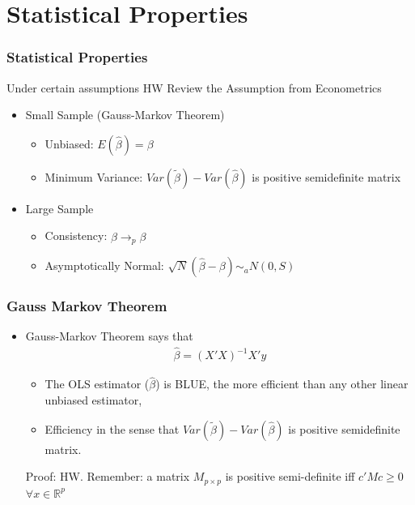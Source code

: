 \documentclass[
  shownotes,
  xcolor={svgnames},
  hyperref={colorlinks,citecolor=DarkBlue,linkcolor=DarkRed,urlcolor=DarkBlue}
  , aspectratio=169]{beamer}
\begin{document}
\section{Statistical Properties}
\begin{frame}
\frametitle{Statistical Properties}

Under certain assumptions {\tiny HW Review the Assumption from Econometrics}
\bigskip
\begin{itemize}
  \item Small Sample (Gauss-Markov Theorem)
  \medskip
  \begin{itemize}
    \item Unbiased: $E(\hat \beta) = \beta$
    \medskip
    \item Minimum Variance: $Var(\tilde \beta) - Var(\hat \beta)$ is positive semidefinite matrix
  \end{itemize}
\bigskip  
  \item Large Sample
  \medskip
  \begin{itemize}
    \item Consistency: $\hat \beta \rightarrow_p \beta$
    \medskip
    \item Asymptotically Normal: $\sqrt{N}(\hat \beta -\beta) \sim_a N(0,S)$
  \end{itemize}

\end{itemize}


\end{frame}
\begin{frame}
\frametitle{Gauss Markov Theorem}

\begin{itemize}

\item Gauss-Markov Theorem says that 
\medskip
\begin{align}
 \hat \beta = (X'X)^{-1} X'y
\end{align}

\bigskip

\begin{itemize}
  \item The OLS estimator ($\hat \beta$) is BLUE, the more efficient than any other linear unbiased estimator, 
  \medskip
  \item Efficiency in the sense that  $Var(\tilde \beta) - Var(\hat \beta)$ is positive semidefinite matrix.
\end{itemize}

\bigskip
\tiny Proof: HW. Remember: a matrix $M_{p\times p}$ is positive semi-definite iff $c'Mc\geq0$ $\forall x\in \mathbb{R}^p$
\end{itemize}
\end{frame}
\end{document}
